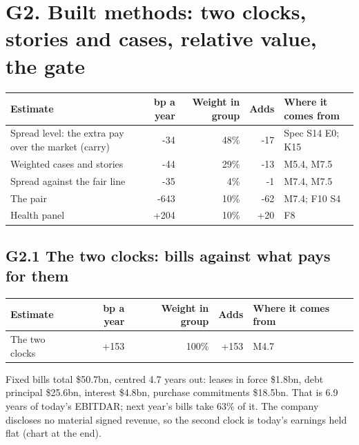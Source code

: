 \documentclass[11pt,a4paper]{article}
\begin{document}
\section*{G2. Built methods: two clocks, stories and cases, relative value, the gate}
\par\noindent{}
\begin{center}\footnotesize\setlength{\tabcolsep}{3.5pt}\begin{tabular}{@{}p{6.2cm}rrrp{4.2cm}@{}}\toprule
Estimate & bp a year & Weight in group & Adds & Where it comes from \\\midrule
Spread level: the extra pay over the market (carry) & -34 & 48\% & -17 & Spec S14 E0; K15 \\
Weighted cases and stories & -44 & 29\% & -13 & M5.4, M7.5 \\
Spread against the fair line & -35 & 4\% & -1 & M7.4, M7.5 \\
The pair & -643 & 10\% & -62 & M7.4; F10 S4 \\
Health panel & +204 & 10\% & +20 & F8 \\
\bottomrule\end{tabular}\end{center}
\subsection*{G2.1 The two clocks: bills against what pays for them}
\par\noindent{}
\begin{center}\footnotesize\setlength{\tabcolsep}{3.5pt}\begin{tabular}{@{}p{6.2cm}rrrp{4.2cm}@{}}\toprule
Estimate & bp a year & Weight in group & Adds & Where it comes from \\\midrule
The two clocks & +153 & 100\% & +153 & M4.7 \\
\bottomrule\end{tabular}\end{center}
Fixed bills total \$50.7bn, centred 4.7 years out: leases in force \$1.8bn, debt principal \$25.6bn, interest \$4.8bn, purchase commitments \$18.5bn. That is 6.9 years of today's EBITDAR; next year's bills take 63\% of it.
The company discloses no material signed revenue, so the second clock is today's earnings held flat (chart at the end).
\end{document}
